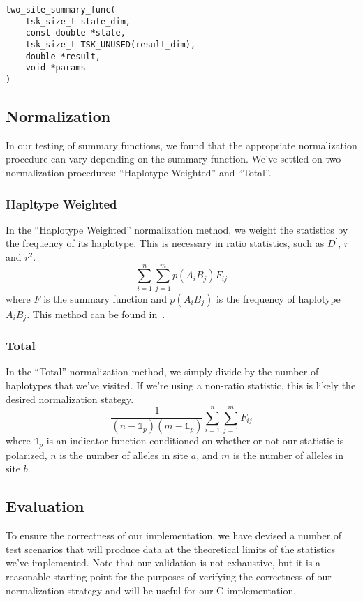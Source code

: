 \documentclass[12pt]{article}
\begin{document}
\begin{verbatim}
two_site_summary_func(
	tsk_size_t state_dim,
	const double *state,
	tsk_size_t TSK_UNUSED(result_dim),
	double *result,
	void *params
)
\end{verbatim}

\subsection{Normalization} \label{section:normalization}
In our testing of summary functions, we found that the appropriate normalization
procedure can vary depending on the summary function. We've settled on two
normalization procedures: ``Haplotype Weighted'' and ``Total''.

\subsubsection{Hapltype Weighted}
In the ``Haplotype Weighted'' normalization method, we weight the statistics by
the frequency of its haplotype. This is necessary in ratio statistics, such as
$D^{\prime}$, $r$ and $r^{2}$.
\[
  \sum_{i=1}^{n}\sum_{j=1}^{m}p(A_{i}B_{j})F_{ij}
\]
where $F$ is the summary function and $p(A_{i}B_{j})$ is the frequency of
haplotype $A_{i}B_{j}$. This method can be found
in~\cite{zhao2007evaluation}.
\subsubsection{Total}
In the ``Total'' normalization method, we simply divide by the number of
haplotypes that we've visited. If we're using a non-ratio statistic, this is
likely the desired normalization stategy.
\[
  \frac{1}{(n-\mathbb{1}_{p}) (m-\mathbb{1}_{p})}\sum_{i=1}^{n}\sum_{j=1}^{m}F_{ij}
\]
where $\mathbb{1}_{p}$ is an indicator function conditioned on whether or not
our statistic is polarized, $n$ is the number of alleles in site $a$, and $m$ is
the number of alleles in site $b$.

\subsection{Evaluation}
To ensure the correctness of our implementation, we have devised a number of
test scenarios that will produce data at the theoretical limits of the
statistics we've implemented. Note that our validation is not exhaustive, but it
is a reasonable starting point for the purposes of verifying the correctness of
our normalization strategy and will be useful for our C implementation.
\end{document}
